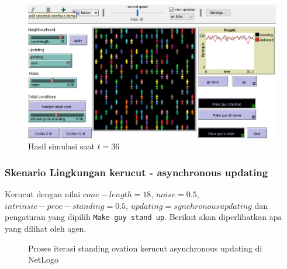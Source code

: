 \begin{figure}[H]
\centering
\includegraphics[width=\linewidth]{images/ch03/sop12}
\caption{Hasil simulasi saat $t=36$}
\label{fig:sop12}
\end{figure}

\subsubsection{Skenario Lingkungan kerucut - asynchronous updating}

Kerucut dengan nilai $cone-length=18$, $noise=0.5$, $intrinsic-proc-standing=0.5$, $updating=synchronous updating$ dan pengaturan yang dipilih \texttt{Make guy stand up}. Berikut akan diperlihatkan apa yang dilihat oleh agen.

\begin{figure}[H]
	\centering
	\hfill
	\hfill
	\hfill
	\caption{Proses iterasi standing ovation kerucut asynchronous updating di NetLogo}
	\label{fig:proses_sop_kerucut_async}
\end{figure}

